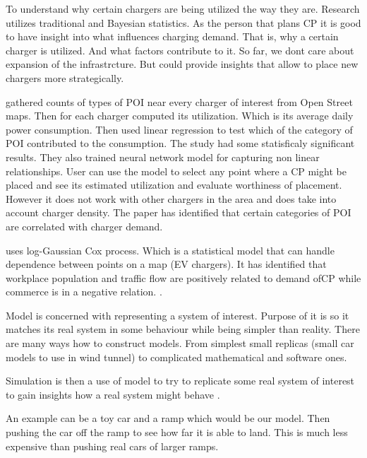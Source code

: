To understand why certain chargers are being utilized the way they are. Research utilizes traditional and Bayesian statistics. As the person that plans \acrfull{CP} it is good to have insight into what influences charging demand. That is, why a certain charger is utilized. And what factors contribute to it. So far, we dont care about expansion of the infrastrcture. But could provide insights that allow to place new chargers more strategically.

 gathered counts of types of \acrfull{POI} near every charger of interest  from Open Street maps. Then for each charger computed its utilization. Which is its average daily power consumption. Then used linear regression to test which of the category of \acrfull{POI} contributed to the consumption.
The study had some statisficaly significant results. They also trained neural network model for capturing non linear relationships. User can use the model to select any point where a \acrfull{CP} might be placed and see its estimated utilization and evaluate worthiness of placement. However it does not work with other chargers in the area and does take into account charger density. The paper has identified that certain categories of \acrfull{POI} are correlated with charger demand.

 uses log-Gaussian Cox process. Which is a statistical model that can handle dependence between points on a map (EV chargers). It has identified that workplace population and traffic flow are positively related to demand of\acrfull{CP} while commerce is in a negative relation. .

\begin{kaobox}[frametitle=Simulation vs Model ]
    Model is concerned with representing a system of interest. Purpose of it is so it matches its real system in some behaviour while being simpler than reality. There are many ways how to construct models. From simplest small replicas (small car models to use in wind tunnel) to complicated mathematical and software ones.

    Simulation is then a use of model to try to replicate some real system of interest to gain insights how a real system might behave .

    An example can be a toy car and a ramp which would be our model. Then pushing the car off the ramp to see how far it is able to land. This is much less expensive than pushing real cars of larger ramps.

    \cite{maria1997introduction}
\end{kaobox}

